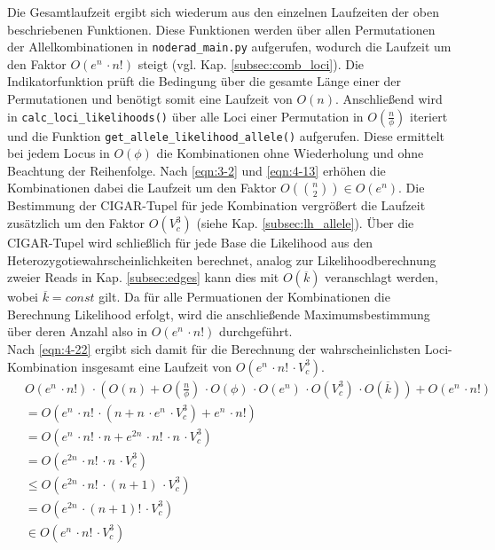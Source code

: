  \label{subsec:loc_compl}
Die Gesamtlaufzeit ergibt sich wiederum aus den einzelnen Laufzeiten der oben beschriebenen Funktionen. Diese Funktionen werden über allen Permutationen der Allelkombinationen in \lstinline|noderad_main.py| aufgerufen, wodurch die Laufzeit um den Faktor $ O(e^n \, \cdotp n!)$ steigt (vgl. Kap. \ref{subsec:comb_loci}). Die Indikatorfunktion prüft die Bedingung über die gesamte Länge einer der Permutationen und benötigt somit eine Laufzeit von $ O(n) $. Anschließend wird in \lstinline|calc_loci_likelihoods()| über alle Loci einer Permutation in $ O(\frac{n}{\phi}) $ iteriert und die Funktion \lstinline|get_allele_likelihood_allele()| aufgerufen. Diese ermittelt bei jedem Locus in $O(\phi) $ die Kombinationen ohne Wiederholung und ohne Beachtung der Reihenfolge. Nach \eqref{eqn:3-2} und \eqref{eqn:4-13} erhöhen die Kombinationen dabei die Laufzeit um den Faktor $ O(\binom{n}{2}) \in O(e^n) $. Die Bestimmung der CIGAR-Tupel für jede Kombination vergrößert die Laufzeit zusätzlich um den Faktor $O(V_{c}^3)$ (siehe Kap. \ref{subsec:lh_allele}). Über die CIGAR-Tupel wird schließlich für jede Base die Likelihood aus den Heterozygotiewahrscheinlichkeiten berechnet, analog zur Likelihoodberechnung zweier Reads in Kap. \ref{subsec:edges} kann dies mit $O(\overline{k}) $ veranschlagt werden, wobei $\overline{k}=const$ gilt. Da für alle Permuationen der Kombinationen die Berechnung Likelihood erfolgt, wird die anschließende Maximumsbestimmung über deren Anzahl also in $O(e^n\, \cdotp n!) $ durchgeführt.\\

Nach \eqref{eqn:4-22} ergibt sich damit für die Berechnung der wahrscheinlichsten Loci-Kombination insgesamt eine Laufzeit von $ O(e^n \, \cdotp n! \, \cdotp V_{c}^3)$.
\begin{equation} \label{eqn:4-22}
\tag{4-22}
\begin{aligned}
&\ {}O(e^n \, \cdotp n!) \, \cdotp \left( O(n) + O\left( \frac{n}{\phi} \right) \, \cdotp O(\phi) \, \cdotp O(e^n)  \, \cdotp O(V_{c}^3) \, \cdotp O(\overline{k})\right) + O(e^n\, \cdotp n!) \\
&\ =O(e^n \, \cdotp n! \, \cdotp(n + n \, \cdotp e^n \, \cdotp V_{c}^3)+ e^n\, \cdotp n!)  \\
&\ =O(e^n \, \cdotp n! \, \cdotp n + e^{2n} \, \cdotp n! \, \cdotp n \, \cdotp V_{c}^3)\\
&\ =O(e^{2n} \, \cdotp n! \, \cdotp n \, \cdotp V_{c}^3)\\
&\ \leq O(e^{2n} \, \cdotp n! \, \cdotp (n + 1) \, \cdotp V_{c}^3)\\
&\ = O(e^{2n} \, \cdotp (n + 1)! \, \cdotp V_{c}^3)\\
&\ \in O(e^n \, \cdotp n! \, \cdotp V_{c}^3)\\
\end{aligned}
\end{equation}

